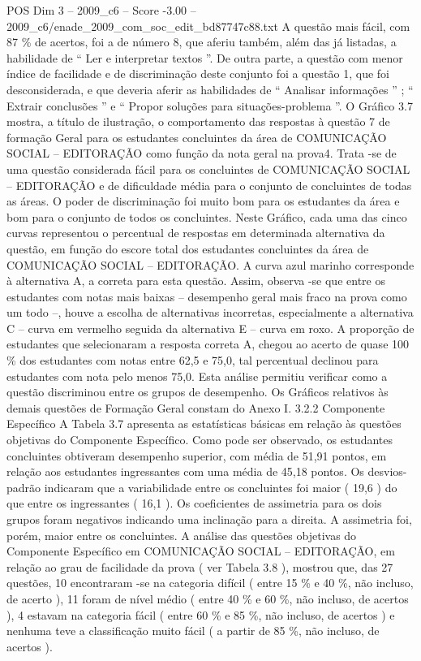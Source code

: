 \begin{textsample}{POS Dim 3 – 2009\_c6 – Score -3.00 – 2009\_c6/enade\_2009\_com\_soc\_edit\_bd87747c88.txt}
A questão mais fácil, com 87 \% de acertos, foi a de número 8, que aferiu também, além das já listadas, a habilidade de “ Ler e interpretar textos ”.
De outra parte, a questão com menor índice de facilidade e de discriminação deste conjunto foi a questão 1, que foi desconsiderada, e que deveria aferir as habilidades de “ Analisar informações ” ; “ Extrair conclusões ” e “ Propor soluções para situações-problema ”.
O Gráfico 3.7 mostra, a título de ilustração, o comportamento das respostas à questão 7 de formação Geral para os estudantes concluintes da área de COMUNICAÇÃO SOCIAL – EDITORAÇÃO como função da nota geral na prova4.
Trata -se de uma questão considerada fácil para os concluintes de COMUNICAÇÃO SOCIAL – EDITORAÇÃO e de dificuldade média para o conjunto de concluintes de todas as áreas.
O poder de discriminação foi muito bom para os estudantes da área e bom para o conjunto de todos os concluintes.
Neste Gráfico, cada uma das cinco curvas representou o percentual de respostas em determinada alternativa da questão, em função do escore total dos estudantes concluintes da área de COMUNICAÇÃO SOCIAL – EDITORAÇÃO.
A curva azul marinho corresponde à alternativa A, a correta para esta questão.
Assim, observa -se que entre os estudantes com notas mais baixas – desempenho geral mais fraco na prova como um todo –, houve a escolha de alternativas incorretas, especialmente a alternativa C – curva em vermelho seguida da alternativa E – curva em roxo.
A proporção de estudantes que selecionaram a resposta correta A, chegou ao acerto de quase 100 \% dos estudantes com notas entre 62,5 e 75,0, tal percentual declinou para estudantes com nota pelo menos 75,0.
Esta análise permitiu verificar como a questão discriminou entre os grupos de desempenho.
Os Gráficos relativos às demais questões de Formação Geral constam do Anexo I. 3.2.2 Componente Específico A Tabela 3.7 apresenta as estatísticas básicas em relação às questões objetivas do Componente Específico.
Como pode ser observado, os estudantes concluintes obtiveram desempenho superior, com média de 51,91 pontos, em relação aos estudantes ingressantes com uma média de 45,18 pontos.
Os desvios-padrão indicaram que a variabilidade entre os concluintes foi maior ( 19,6 ) do que entre os ingressantes ( 16,1 ).
Os coeficientes de assimetria para os dois grupos foram negativos indicando uma inclinação para a direita.
A assimetria foi, porém, maior entre os concluintes.
A análise das questões objetivas do Componente Específico em COMUNICAÇÃO SOCIAL – EDITORAÇÃO, em relação ao grau de facilidade da prova ( ver Tabela 3.8 ), mostrou que, das 27 questões, 10 encontraram -se na categoria difícil ( entre 15 \% e 40 \%, não incluso, de acerto ), 11 foram de nível médio ( entre 40 \% e 60 \%, não incluso, de acertos ), 4 estavam na categoria fácil ( entre 60 \% e 85 \%, não incluso, de acertos ) e nenhuma teve a classificação muito fácil ( a partir de 85 \%, não incluso, de acertos ).

\end{textsample}
